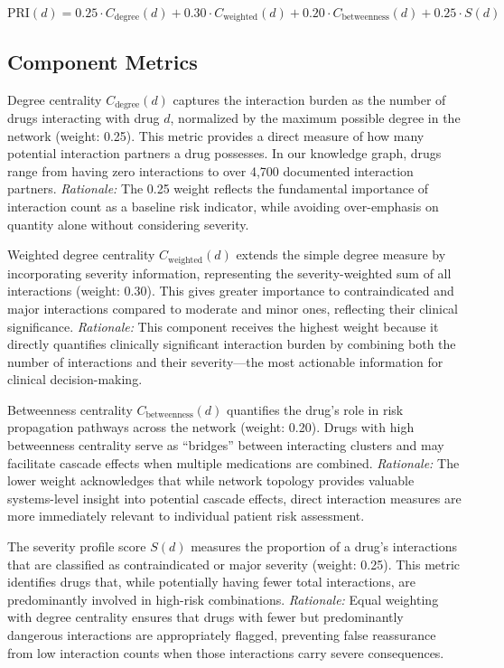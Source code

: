 \documentclass[11pt,a4paper]{article}
\begin{document}
\begin{equation}
\text{PRI}(d) = 0.25 \cdot C_{\text{degree}}(d) + 0.30 \cdot C_{\text{weighted}}(d) + 0.20 \cdot C_{\text{betweenness}}(d) + 0.25 \cdot S(d)
\label{eq:pri}
\end{equation}

\subsection{Component Metrics}

Degree centrality $C_{\text{degree}}(d)$ captures the interaction burden as the number of drugs interacting with drug $d$, normalized by the maximum possible degree in the network (weight: 0.25). This metric provides a direct measure of how many potential interaction partners a drug possesses. In our knowledge graph, drugs range from having zero interactions to over 4,700 documented interaction partners. \textit{Rationale:} The 0.25 weight reflects the fundamental importance of interaction count as a baseline risk indicator, while avoiding over-emphasis on quantity alone without considering severity.

Weighted degree centrality $C_{\text{weighted}}(d)$ extends the simple degree measure by incorporating severity information, representing the severity-weighted sum of all interactions (weight: 0.30). This gives greater importance to contraindicated and major interactions compared to moderate and minor ones, reflecting their clinical significance. \textit{Rationale:} This component receives the highest weight because it directly quantifies clinically significant interaction burden by combining both the number of interactions and their severity---the most actionable information for clinical decision-making.

Betweenness centrality $C_{\text{betweenness}}(d)$ quantifies the drug's role in risk propagation pathways across the network (weight: 0.20). Drugs with high betweenness centrality serve as ``bridges'' between interacting clusters and may facilitate cascade effects when multiple medications are combined. \textit{Rationale:} The lower weight acknowledges that while network topology provides valuable systems-level insight into potential cascade effects, direct interaction measures are more immediately relevant to individual patient risk assessment.

The severity profile score $S(d)$ measures the proportion of a drug's interactions that are classified as contraindicated or major severity (weight: 0.25). This metric identifies drugs that, while potentially having fewer total interactions, are predominantly involved in high-risk combinations. \textit{Rationale:} Equal weighting with degree centrality ensures that drugs with fewer but predominantly dangerous interactions are appropriately flagged, preventing false reassurance from low interaction counts when those interactions carry severe consequences.
\end{document}
